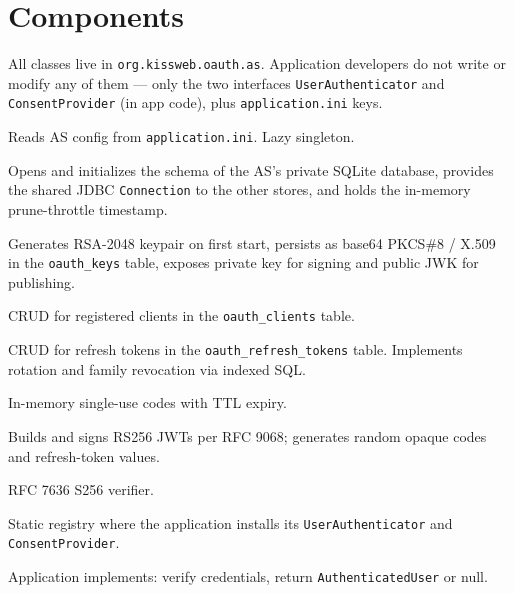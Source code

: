 \section{Components}
\label{sec:as-components}

All classes live in \texttt{org.kiss\-web.oauth.as}.  Application developers do not write or modify any of them --- only the two interfaces \texttt{UserAuthenticator} and \texttt{ConsentProvider} (in app code), plus \texttt{appli\-cation.ini} keys.

\begin{description}[style=nextline]
  \item[\texttt{AuthorizationServerConfig}\index{AuthorizationServerConfig}]  Reads AS config from \texttt{application.ini}.  Lazy singleton.
  \item[\texttt{OAuthSqliteStore}\index{OAuthSqliteStore}]  Opens and initializes the schema of the AS's private SQLite database, provides the shared JDBC \texttt{Connection} to the other stores, and holds the in-memory prune-throttle timestamp.
  \item[\texttt{KeyManager}\index{KeyManager}]  Generates RSA-2048 keypair on first start, persists as base64 PKCS\#8 / X.509 in the \texttt{oauth\_keys} table, exposes private key for signing and public JWK for publishing.
  \item[\texttt{ClientStore}\index{ClientStore}]  CRUD for registered clients in the \texttt{oauth\_clients} table.
  \item[\texttt{RefreshTokenStore}\index{RefreshTokenStore}]  CRUD for refresh tokens in the \texttt{oauth\_refresh\_tokens} table.  Implements rotation and family revocation via indexed SQL.
  \item[\texttt{AuthorizationCodeStore}\index{AuthorizationCodeStore}]  In-memory single-use codes with TTL expiry.
  \item[\texttt{TokenIssuer}\index{TokenIssuer}]  Builds and signs RS256 JWTs per RFC 9068; generates random opaque codes and refresh-token values.
  \item[\texttt{PkceValidator}\index{PkceValidator}]  RFC 7636 S256 verifier.
  \item[\texttt{AsExtensions}\index{AsExtensions}]  Static registry where the application installs its \texttt{User\-Authenticator} and \texttt{ConsentProvider}.
  \item[\texttt{UserAuthenticator}\index{UserAuthenticator} \emph{(interface)}]  Application implements: verify credentials, return \texttt{AuthenticatedUser} or null.

\end{description}
